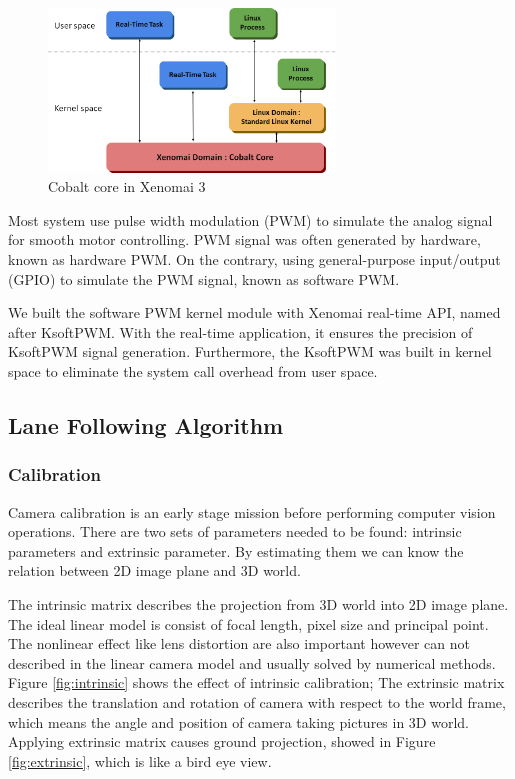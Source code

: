 \documentclass[conference]{IEEEtran}
\begin{document}
\begin{figure}
	\centering
	\includegraphics[width=3in]{img/xeno_arch.png}
	\caption{Cobalt core in Xenomai 3}
	\label{fig:xeno_arch}
\end{figure}

Most system use pulse width modulation (PWM) to simulate the analog signal for smooth motor controlling. PWM signal was often generated by hardware, known as hardware PWM. On the contrary, using general-purpose input/output (GPIO) to simulate the PWM signal, known as software PWM.

We built the software PWM kernel module with Xenomai real-time API, named after KsoftPWM. With the real-time application, it ensures the precision of KsoftPWM signal generation. Furthermore, the KsoftPWM was built in kernel space to eliminate the system call overhead from user space.

\subsection{Lane Following Algorithm}

\subsubsection{Calibration}

Camera calibration is an early stage mission before performing computer vision operations. There are two sets of parameters needed to be found: intrinsic parameters and extrinsic parameter. By estimating them we can know the relation between 2D image plane and 3D world.

The intrinsic matrix describes the projection from 3D world into 2D image plane. The ideal linear model is consist of focal length, pixel size and principal point. The nonlinear effect like lens distortion are also important however can not described in the linear camera model and usually solved by numerical methods. Figure \ref{fig:intrinsic} shows the effect of intrinsic calibration; The extrinsic matrix describes the translation and rotation of camera with respect to the world frame, which means the angle and position of camera taking pictures in 3D world. Applying extrinsic matrix causes ground projection, showed in Figure \ref{fig:extrinsic}, which is like a bird eye view.
\end{document}

